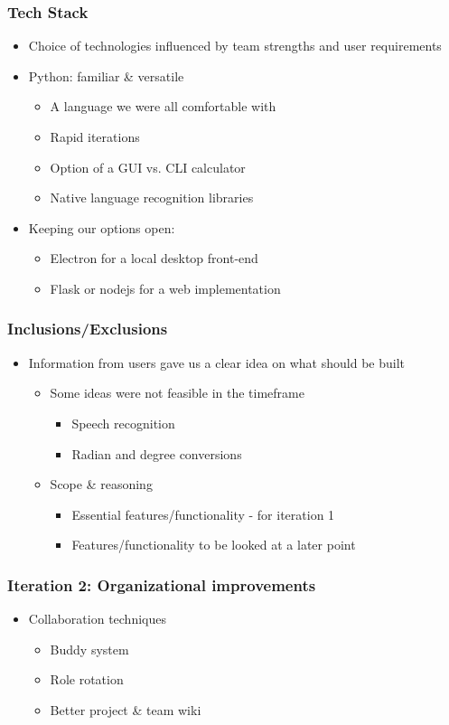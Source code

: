 \documentclass{beamer}
\begin{document}
\begin{frame}
\frametitle{Tech Stack}
 \begin{itemize}
  \item Choice of technologies influenced by team strengths and user requirements
  \item Python: familiar \& versatile
   \begin{itemize}
    \item A language we were all comfortable with
    \item Rapid iterations
    \item Option of a GUI vs. CLI calculator
    \item Native language recognition libraries
   \end{itemize}
  \item Keeping our options open:
   \begin{itemize}
    \item Electron for a local desktop front-end
    \item Flask or nodejs for a web implementation
   \end{itemize}
  \end{itemize}
\end{frame}

\begin{frame}
\frametitle{Inclusions/Exclusions}
\begin{itemize}
 \item Information from users gave us a clear idea on what should be built
  \begin{itemize}
  \item Some ideas were not feasible in the timeframe
  \begin{itemize}
    \item Speech recognition
    \item Radian and degree conversions
  \end{itemize}
  \item Scope \& reasoning
    \begin{itemize}
    \item Essential features/functionality - for iteration 1
    \item Features/functionality to be looked at a later point
  \end{itemize}
  \end{itemize}
  \end{itemize}
\end{frame}

\begin{frame}
\frametitle{Iteration 2: Organizational improvements}
\begin{itemize}
 \item Collaboration techniques
  \begin{itemize}
   \item Buddy system
   \item Role rotation
   \item Better project \& team wiki
  \end{itemize}
\end{itemize}
\end{frame}
\end{document}
